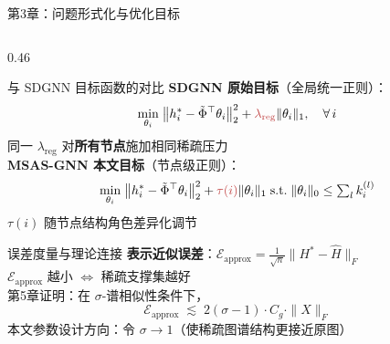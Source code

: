 \documentclass[aspectratio=169,9pt,xcolor=dvipsnames]{beamer}
\begin{document}
\begin{frame}{第3章：问题形式化与优化目标}
\begin{columns}[T]
    \begin{column}{0.46\textwidth}
      \begin{alertblock}{与 SDGNN 目标函数的对比}
        \textbf{SDGNN 原始目标}（全局统一正则）：
        \begin{equation*}
          \min_{\theta_i}\;\bigl\|h_i^*-\tilde{\Phi}^\top\theta_i\bigr\|_2^2
          +{\color{myred}\lambda_{\mathrm{reg}}}\|\theta_i\|_1,\quad\forall\,i
        \end{equation*}
        同一 $\lambda_{\mathrm{reg}}$ 对\textbf{所有节点}施加相同稀疏压力\\[4pt]
        \textbf{MSAS-GNN 本文目标}（节点级正则）：
        \begin{equation*}
          \min_{\theta_i}\;\bigl\|h_i^*-\tilde{\Phi}^\top\theta_i\bigr\|_2^2
          +{\color{myred}\tau(i)}\|\theta_i\|_1
          \;\text{s.t.}\;\|\theta_i\|_0\leq\textstyle\sum_l k_i^{(l)}
        \end{equation*}
        $\tau(i)$ 随节点结构角色差异化调节
      \end{alertblock}
      \vspace{-0.27cm}
      \begin{block}{误差度量与理论连接}
        \textbf{表示近似误差}：$\mathcal{E}_{\mathrm{approx}}=\frac{1}{\sqrt{n}}\|H^*-\hat{H}\|_F$\\[3pt]
        $\mathcal{E}_{\mathrm{approx}}$ 越小 $\Leftrightarrow$ 稀疏支撑集越好\\[3pt]
        第5章证明：在 $\sigma$-谱相似性条件下，
        \begin{equation*}
          \mathcal{E}_{\mathrm{approx}} \;\lesssim\; 2(\sigma-1)\cdot C_g\cdot\|X\|_F
        \end{equation*}
        本文参数设计方向：令 $\sigma\to 1$（使稀疏图谱结构更接近原图）
      \end{block}
    \end{column}
  \end{columns}
\end{frame}
\end{document}
